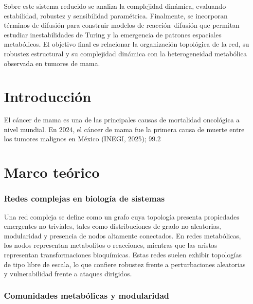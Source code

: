 \documentclass[12pt,spanish]{report}
\begin{document}
	Sobre este sistema reducido se analiza la complejidad dinámica, evaluando estabilidad, robustez y sensibilidad paramétrica. Finalmente, se incorporan términos de difusión para construir modelos de reacción--difusión que permitan estudiar inestabilidades de Turing y la emergencia de patrones espaciales metabólicos. El objetivo final es relacionar la organización topológica de la red, su robustez estructural y su complejidad dinámica con la heterogeneidad metabólica observada en tumores de mama.
	\chapter{Introducción}
	El cáncer de mama es una de las principales causas de mortalidad oncológica a nivel mundial. En 2024, el cáncer de mama fue la primera causa de muerte entre los tumores malignos en México (INEGI, 2025); 99.2 %
	
	\chapter{Marco teórico}
	\subsection{Redes complejas en biología de sistemas}
	
	Una red compleja se define como un grafo cuya topología presenta propiedades emergentes no triviales, tales como distribuciones de grado no aleatorias, modularidad y presencia de nodos altamente conectados. En redes metabólicas, los nodos representan metabolitos o reacciones, mientras que las aristas representan transformaciones bioquímicas. Estas redes suelen exhibir topologías de tipo libre de escala, lo que confiere robustez frente a perturbaciones aleatorias y vulnerabilidad frente a ataques dirigidos.
	
	\subsection{Comunidades metabólicas y modularidad}
	
\end{document}
